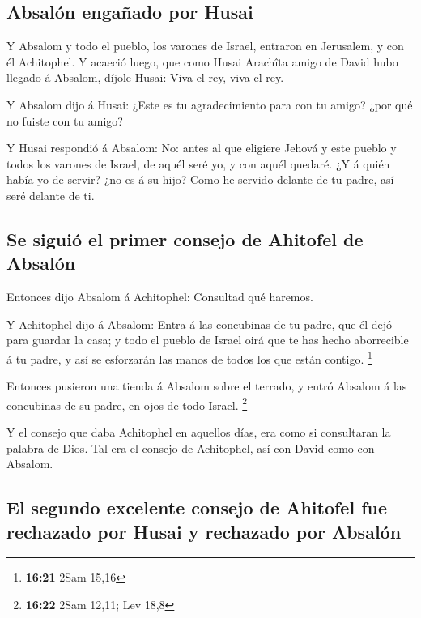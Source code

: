 \hypertarget{absaluxf3n-engauxf1ado-por-husai}{%
\subsection{Absalón engañado por
Husai}\label{absaluxf3n-engauxf1ado-por-husai}}

 Y Absalom y todo el pueblo, los varones de Israel,
entraron en Jerusalem, y con él Achitophel.  Y acaeció
luego, que como Husai Arachîta amigo de David hubo llegado á Absalom,
díjole Husai: Viva el rey, viva el rey.

 Y Absalom dijo á Husai: ¿Este es tu agradecimiento para
con tu amigo? ¿por qué no fuiste con tu amigo?

 Y Husai respondió á Absalom: No: antes al que eligiere
Jehová y este pueblo y todos los varones de Israel, de aquél seré yo, y
con aquél quedaré.  ¿Y á quién había yo de servir? ¿no es
á su hijo? Como he servido delante de tu padre, así seré delante de ti.

\hypertarget{se-siguiuxf3-el-primer-consejo-de-ahitofel-de-absaluxf3n}{%
\subsection{Se siguió el primer consejo de Ahitofel de
Absalón}\label{se-siguiuxf3-el-primer-consejo-de-ahitofel-de-absaluxf3n}}

 Entonces dijo Absalom á Achitophel: Consultad qué
haremos.

 Y Achitophel dijo á Absalom: Entra á las concubinas de
tu padre, que él dejó para guardar la casa; y todo el pueblo de Israel
oirá que te has hecho aborrecible á tu padre, y así se esforzarán las
manos de todos los que están contigo. \footnote{\textbf{16:21} 2Sam
  15,16}

 Entonces pusieron una tienda á Absalom sobre el terrado,
y entró Absalom á las concubinas de su padre, en ojos de todo Israel.
\footnote{\textbf{16:22} 2Sam 12,11; Lev 18,8}

 Y el consejo que daba Achitophel en aquellos días, era
como si consultaran la palabra de Dios. Tal era el consejo de
Achitophel, así con David como con Absalom.

\hypertarget{el-segundo-excelente-consejo-de-ahitofel-fue-rechazado-por-husai-y-rechazado-por-absaluxf3n}{%
\subsection{El segundo excelente consejo de Ahitofel fue rechazado por
Husai y rechazado por
Absalón}\label{el-segundo-excelente-consejo-de-ahitofel-fue-rechazado-por-husai-y-rechazado-por-absaluxf3n}}

